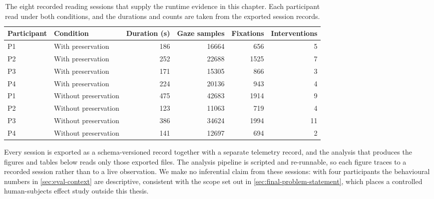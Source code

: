 \begin{table}[htbp]
\centering
\caption[The eight recorded reading sessions.]{The eight recorded reading sessions that supply the runtime evidence in this chapter. Each participant read under both conditions, and the durations and counts are taken from the exported session records.}
\label{tab:eval-sessions}
\small
\begin{tabular}{llrrrr}
\toprule
Participant & Condition & Duration (s) & Gaze samples & Fixations & Interventions \\
\midrule
P1 & With preservation    & 186 & 16664 & 656  & 5 \\
P2 & With preservation    & 252 & 22688 & 1525 & 7 \\
P3 & With preservation    & 171 & 15305 & 866  & 3 \\
P4 & With preservation    & 224 & 20136 & 943  & 4 \\
P1 & Without preservation & 475 & 42683 & 1914 & 9 \\
P2 & Without preservation & 123 & 11063 & 719  & 4 \\
P3 & Without preservation & 386 & 34624 & 1994 & 11 \\
P4 & Without preservation & 141 & 12697 & 694  & 2 \\
\bottomrule
\end{tabular}
\end{table}

Every session is exported as a schema-versioned record together with a separate telemetry record, and the analysis that produces the figures and tables below reads only those exported files.
The analysis pipeline is scripted and re-runnable, so each figure traces to a recorded session rather than to a live observation.
We make no inferential claim from these sessions: with four participants the behavioural numbers in \cref{sec:eval-context} are descriptive, consistent with the scope set out in \cref{sec:final-problem-statement}, which places a controlled human-subjects effect study outside this thesis.
